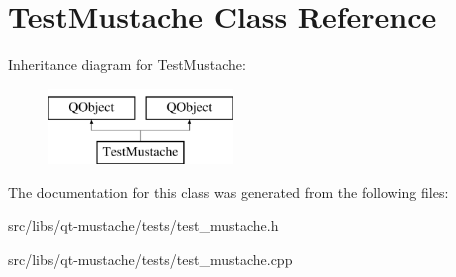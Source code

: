 \hypertarget{classTestMustache}{}\section{Test\+Mustache Class Reference}
\label{classTestMustache}
Inheritance diagram for Test\+Mustache\+:\begin{figure}[H]
\begin{center}
\leavevmode
\includegraphics[height=2.000000cm]{de/d63/classTestMustache}
\end{center}
\end{figure}


The documentation for this class was generated from the following files\+:\begin{DoxyCompactItemize}
\item 
src/libs/qt-\/mustache/tests/test\+\_\+mustache.\+h\item 
src/libs/qt-\/mustache/tests/test\+\_\+mustache.\+cpp\end{DoxyCompactItemize}
